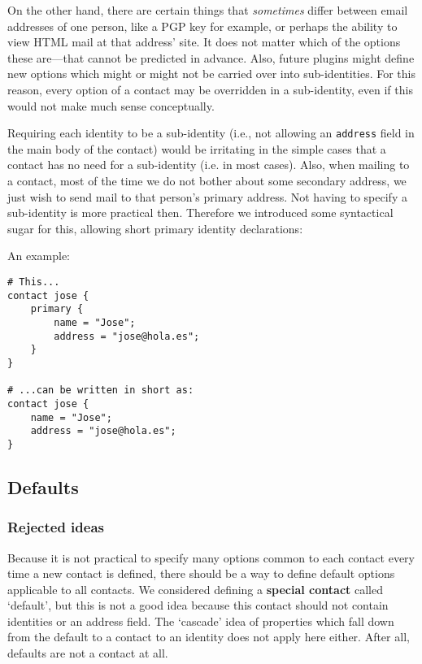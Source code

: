 \documentclass[a4paper]{article}
\begin{document}
On the other hand, there are certain things that \emph{sometimes} differ
between email addresses of one person, like a PGP key for example, or
perhaps the ability to view HTML mail at that address' site.  It does
not matter which of the options these are---that cannot be predicted in
advance.  Also, future plugins might define new options which might or
might not be carried over into sub-identities.  For this reason, every
option of a contact may be overridden in a sub-identity, even if this
would not make much sense conceptually.

Requiring each identity to be a sub-identity (i.e., not allowing an
\texttt{address} field in the main body of the contact) would be
irritating in the simple cases that a contact has no need for a
sub-identity (i.e. in most cases).  Also, when mailing to a contact,
most of the time we do not bother about some secondary address, we just
wish to send mail to that person's primary address.  Not having to
specify a sub-identity is more practical then.  Therefore we introduced
some syntactical sugar for this, allowing short primary identity
declarations:

An example:
\begin{verbatim}
# This...
contact jose {
    primary {
        name = "Jose";
        address = "jose@hola.es";
    }
}

# ...can be written in short as:
contact jose {
    name = "Jose";
    address = "jose@hola.es";
}
\end{verbatim}


\subsection{Defaults}

\subsubsection{Rejected ideas}

Because it is not practical to specify many options common to each
contact every time a new contact is defined, there should be a way to
define default options applicable to all contacts.  We considered
defining a \textbf{special contact} called `default', but this is not a
good idea because this contact should not contain identities or an
address field.  The `cascade' idea of properties which fall down from
the default to a contact to an identity does not apply here either.
After all, defaults are not a contact at all.
\end{document}
